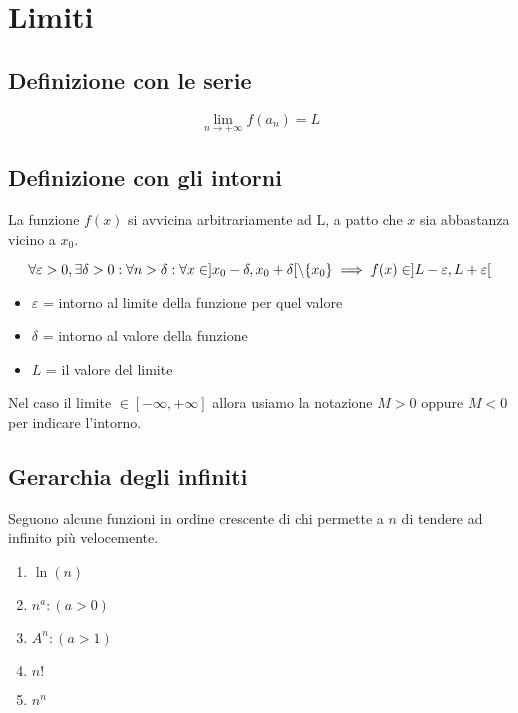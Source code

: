 \documentclass{article}
\begin{document}
\section{Limiti}

\subsection{Definizione con le serie}

$$
\lim_{n \to +\infty} f(a_n) = L
$$

\subsection{Definizione con gli intorni}

La funzione $f(x)$ si avvicina arbitrariamente ad L, a patto che $x$ sia abbastanza vicino a $x_0$.

$$
\forall \varepsilon > 0, \exists \delta > 0 :
\forall n > \delta :
\forall x \in \space ] x_0 - \delta, x_0 + \delta [ \space \backslash \space \{x_0\}
\implies f(x) \in \space ] L - \varepsilon, L + \varepsilon [
$$

\begin{itemize}
    \item $\varepsilon$ = intorno al limite della funzione per quel valore
    \item $\delta$ = intorno al valore della funzione
    \item $L$ = il valore del limite
\end{itemize}

\noindent
Nel caso il limite $\in [-\infty, +\infty]$ allora usiamo la notazione $M > 0$ oppure $M < 0$ per indicare l'intorno.

\subsection{Gerarchia degli infiniti}

Seguono alcune funzioni in ordine crescente di chi permette a $n$ di tendere ad infinito più velocemente.

\begin{enumerate}
    \item $\ln(n)$
    \item $n^a : (a > 0)$
    \item $A^n : (a > 1)$
    \item $n!$
    \item $n^n$
\end{enumerate}
\end{document}
